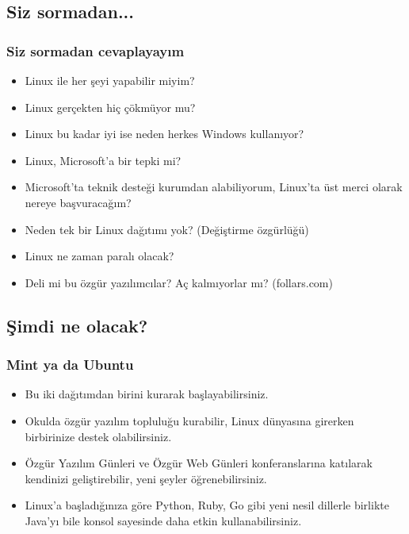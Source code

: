 \documentclass{beamer}
\begin{document}
	\subsection{Siz sormadan...}
	\begin{frame}
	 	\frametitle{Siz sormadan cevaplayayım}
		\begin{itemize}[<+->]
			\item Linux ile her şeyi yapabilir miyim?
			\item Linux gerçekten hiç çökmüyor mu?
			\item Linux bu kadar iyi ise neden herkes Windows kullanıyor?
			\item Linux, Microsoft'a bir tepki mi?
			\item Microsoft'ta teknik desteği kurumdan alabiliyorum, Linux'ta üst merci olarak nereye başvuracağım?
			\item Neden tek bir Linux dağıtımı yok? (Değiştirme özgürlüğü)
			\item Linux ne zaman paralı olacak?
			\item Deli mi bu özgür yazılımcılar? Aç kalmıyorlar mı? (follars.com)
		\end{itemize}

	\end{frame}
	
	\subsection{Şimdi ne olacak?}


	\begin{frame}
	 	\frametitle{Mint ya da Ubuntu}
		\begin{itemize}[<+->]
		 \item Bu iki dağıtımdan birini kurarak başlayabilirsiniz.
		 \item Okulda özgür yazılım topluluğu kurabilir, Linux dünyasına girerken birbirinize destek olabilirsiniz.
		 \item Özgür Yazılım Günleri ve Özgür Web Günleri konferanslarına katılarak kendinizi geliştirebilir, yeni şeyler öğrenebilirsiniz.
		 \item Linux'a başladığınıza göre Python, Ruby, Go gibi yeni nesil dillerle birlikte Java'yı bile konsol sayesinde daha etkin kullanabilirsiniz.
		\end{itemize}

	\end{frame}

\end{document}
